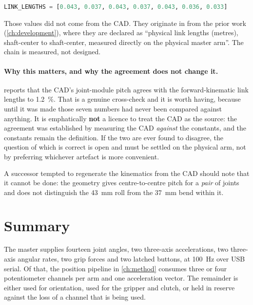\begin{lstlisting}[language=Python]
LINK_LENGTHS = [0.043, 0.037, 0.043, 0.037, 0.043, 0.036, 0.033]
\end{lstlisting}

Those values did not come from the CAD. They originate in
 from the prior work
(\cref{ch:development}), where they are declared as ``physical link lengths
(metres), shaft-center to shaft-center, measured directly on the physical
master arm''. The chain is measured, not designed.

\paragraph{Why this matters, and why the agreement does not change it.}
 reports that the CAD's joint-module pitch agrees with the
forward-kinematic link lengths to \SI{1.2}{\percent}. That is a genuine
cross-check and it is worth having, because until it was made those seven
numbers had never been compared against anything. It is emphatically
\textbf{not} a licence to treat the CAD as the source: the agreement was
established by measuring the CAD \emph{against} the constants, and the
constants remain the definition. If the two are ever found to disagree, the
question of which is correct is open and must be settled on the physical arm,
not by preferring whichever artefact is more convenient.

A successor tempted to regenerate the kinematics from the CAD should note that
it cannot be done: the geometry gives centre-to-centre pitch for a
\emph{pair} of joints and does not distinguish the \SI{43}{\milli\metre} roll
from the \SI{37}{\milli\metre} bend within it.

\section{Summary}

The master supplies fourteen joint angles, two three-axis accelerations, two
three-axis angular rates, two grip forces and two latched buttons, at
\SI{100}{\hertz} over USB serial. Of that, the position pipeline in
\cref{ch:method} consumes three or four potentiometer channels per arm and one
acceleration vector. The remainder is either used for orientation, used for
the gripper and clutch, or held in reserve against the loss of a channel that
is being used.
